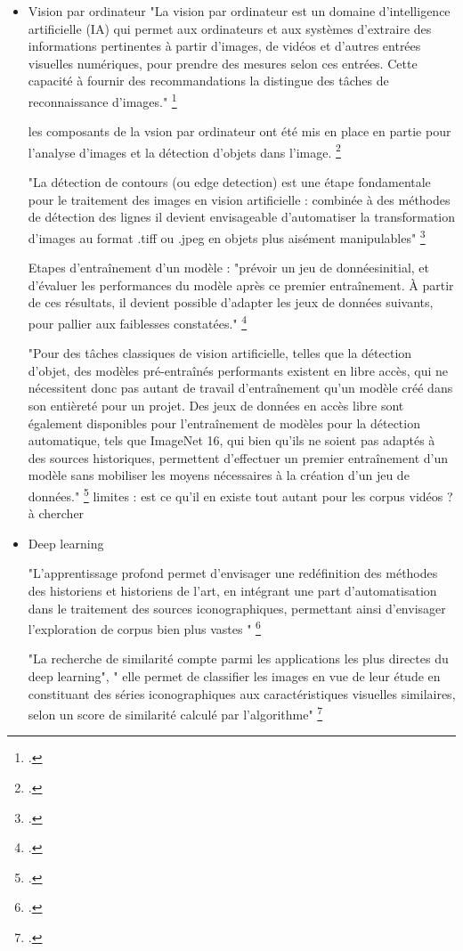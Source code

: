 \begin{itemize}
	\item Vision par ordinateur 
	"La vision par ordinateur est un domaine d’intelligence artificielle (IA) qui permet aux ordinateurs et aux systèmes d’extraire des informations pertinentes à partir d’images, de vidéos et d’autres entrées visuelles numériques, pour prendre des mesures selon ces entrées. Cette capacité à fournir des recommandations la distingue des tâches de reconnaissance d’images." \footcite{2021c}
	
	les composants de la vsion par ordinateur ont été mis en place en partie pour l'analyse d'images et la détection d'objets dans l'image. \footcite{norindr2023}
	
	"La détection de contours (ou edge detection) est une étape fondamentale pour le traitement	des images en vision artificielle : combinée à des méthodes de détection des lignes il devient envisageable d’automatiser la transformation d’images au format .tiff ou .jpeg en	objets plus aisément manipulables" \footcite{norindr2023}
	
	Etapes d'entraînement d'un modèle : "prévoir un jeu de donnéesinitial, et d’évaluer les performances du modèle après ce premier entraînement. À partir	de ces résultats, il devient possible d’adapter les jeux de données suivants, pour pallier	aux faiblesses constatées." \footcite{norindr2023}
	
	"Pour des tâches classiques de vision artificielle, telles que la détection d’objet, des	modèles pré-entraînés performants existent en libre accès, qui ne nécessitent donc pas	autant de travail d’entraînement qu’un modèle créé dans son entièreté pour un projet.
	Des jeux de données en accès libre sont également disponibles pour l’entraînement de	modèles pour la détection automatique, tels que ImageNet 16, qui bien qu’ils ne soient	pas adaptés à des sources historiques, permettent d’effectuer un premier entraînement	d’un modèle sans mobiliser les moyens nécessaires à la création d’un jeu de données." \footcite{norindr2023}
	limites : est ce qu'il en existe tout autant pour les corpus vidéos ? à chercher
	
	\item Deep learning 
	
	"L’apprentissage profond permet d’envisager une redéfinition des méthodes des historiens et historiens de l’art, en intégrant une part d’automatisation dans le traitement des sources iconographiques, permettant ainsi
	d’envisager l’exploration de corpus bien plus vastes " \footcite{norindr2023}
	
	"La recherche de similarité compte parmi les applications les plus directes du deep learning", " elle permet de classifier les images en vue de leur étude en	constituant des séries iconographiques aux caractéristiques visuelles similaires, selon un	score de similarité calculé par l’algorithme" \footcite{norindr2023}

	
\end{itemize}